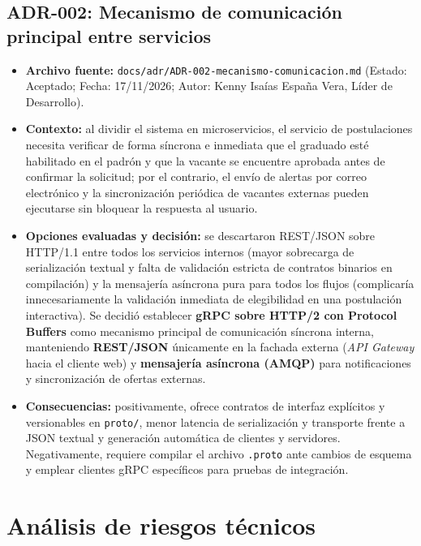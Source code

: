 \documentclass[11pt,a4paper]{article}
\begin{document}
\subsection{ADR-002: Mecanismo de comunicación principal entre servicios}

\begin{itemize}
    \item \textbf{Archivo fuente:} \texttt{docs/adr/ADR-002-mecanismo-comunicacion.md} (Estado: Aceptado; Fecha: 17/11/2026; Autor: Kenny Isaías España Vera, Líder de Desarrollo).
    \item \textbf{Contexto:} al dividir el sistema en microservicios, el servicio de postulaciones necesita verificar de forma síncrona e inmediata que el graduado esté habilitado en el padrón y que la vacante se encuentre aprobada antes de confirmar la solicitud; por el contrario, el envío de alertas por correo electrónico y la sincronización periódica de vacantes externas pueden ejecutarse sin bloquear la respuesta al usuario.
    \item \textbf{Opciones evaluadas y decisión:} se descartaron REST/JSON sobre HTTP/1.1 entre todos los servicios internos (mayor sobrecarga de serialización textual y falta de validación estricta de contratos binarios en compilación) y la mensajería asíncrona pura para todos los flujos (complicaría innecesariamente la validación inmediata de elegibilidad en una postulación interactiva). Se decidió establecer \textbf{gRPC sobre HTTP/2 con Protocol Buffers} como mecanismo principal de comunicación síncrona interna, manteniendo \textbf{REST/JSON} únicamente en la fachada externa (\textit{API Gateway} hacia el cliente web) y \textbf{mensajería asíncrona (AMQP)} para notificaciones y sincronización de ofertas externas.
    \item \textbf{Consecuencias:} positivamente, ofrece contratos de interfaz explícitos y versionables en \texttt{proto/}, menor latencia de serialización y transporte frente a JSON textual y generación automática de clientes y servidores. Negativamente, requiere compilar el archivo \texttt{.proto} ante cambios de esquema y emplear clientes gRPC específicos para pruebas de integración.
\end{itemize}

\section{Análisis de riesgos técnicos}
\end{document}
